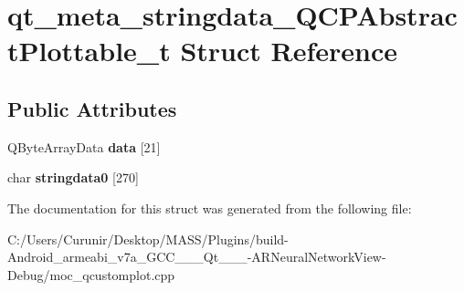 \hypertarget{structqt__meta__stringdata___q_c_p_abstract_plottable__t}{}\section{qt\+\_\+meta\+\_\+stringdata\+\_\+\+Q\+C\+P\+Abstract\+Plottable\+\_\+t Struct Reference}
\label{structqt__meta__stringdata___q_c_p_abstract_plottable__t}
\subsection*{Public Attributes}
\begin{DoxyCompactItemize}
\item 
\mbox{\label{structqt__meta__stringdata___q_c_p_abstract_plottable__t_a26f89d94eabed463ef6cf5f9174197e5}} 
Q\+Byte\+Array\+Data {\bfseries data} \mbox{[}21\mbox{]}
\item 
\mbox{\label{structqt__meta__stringdata___q_c_p_abstract_plottable__t_ae68b53b2a8d74d2a1d40bd62480ee7f6}} 
char {\bfseries stringdata0} \mbox{[}270\mbox{]}
\end{DoxyCompactItemize}


The documentation for this struct was generated from the following file\+:\begin{DoxyCompactItemize}
\item 
C\+:/\+Users/\+Curunir/\+Desktop/\+M\+A\+S\+S/\+Plugins/build-\/\+Android\+\_\+armeabi\+\_\+v7a\+\_\+\+G\+C\+C\+\_\+\_\+\_\+\+Qt\+\_\+\_\+\_-\/\+A\+R\+Neural\+Network\+View-\/\+Debug/moc\+\_\+qcustomplot.\+cpp\end{DoxyCompactItemize}
